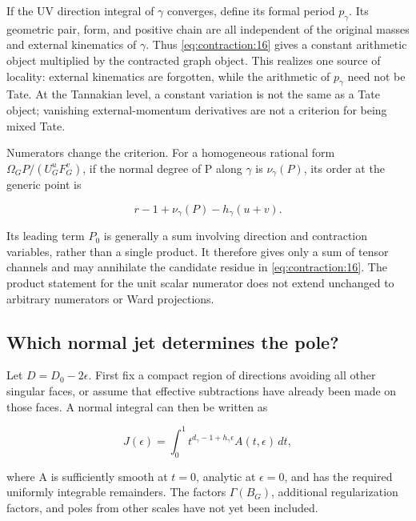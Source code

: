 \documentclass[11pt,a4paper,oneside]{article}
\theoremstyle{plain}
\theoremstyle{definition}
\theoremstyle{remark}
\numberwithin{equation}{section}
\begin{document}
If the UV direction integral of \(\gamma \) converges, define its formal period \(p_\gamma \). Its geometric pair, form, and positive chain are all independent of the original masses and external kinematics of \(\gamma \). Thus \eqref{eq:contraction:16} gives a constant arithmetic object multiplied by the contracted graph object. This realizes one source of locality: external kinematics are forgotten, while the arithmetic of \(p_\gamma \) need not be Tate. At the Tannakian level, a constant variation is not the same as a Tate object; vanishing external-momentum derivatives are not a criterion for being mixed Tate.

Numerators change the criterion. For a homogeneous rational form \(\Omega _G P/(U_G^u F_G^v)\), if the normal degree of P along \(\gamma \) is \(\nu _\gamma (P)\), its order at the generic point is

\begin{equation}
r-1+\nu_\gamma(P)-h_\gamma(u+v).                 \label{eq:contraction:17}
\end{equation}

Its leading term \(P_0\) is generally a sum involving direction and contraction variables, rather than a single product. It therefore gives only a sum of tensor channels and may annihilate the candidate residue in \eqref{eq:contraction:16}. The product statement for the unit scalar numerator does not extend unchanged to arbitrary numerators or Ward projections.


\subsection{Which normal jet determines the pole?}\label{sec:contraction:5}

Let \(D=D_0- 2\epsilon \). First fix a compact region of directions avoiding all other singular faces, or assume that effective subtractions have already been made on those faces. A normal integral can then be written as

\begin{equation}
J(\epsilon)=\int_0^1 t^{d_\gamma-1+h_\gamma\epsilon}
                                A(t,\epsilon)\,dt,             \label{eq:contraction:18}
\end{equation}

where A is sufficiently smooth at \(t=0\), analytic at \(\epsilon =0\), and has the required uniformly integrable remainders. The factors \(\Gamma (B_G)\), additional regularization factors, and poles from other scales have not yet been included.
\end{document}
